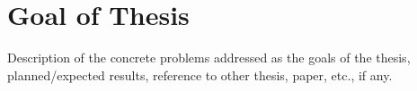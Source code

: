 \section{Goal of Thesis}
\label{sec:goal}

Description of the concrete problems addressed as the goals of the thesis, planned/expected results, reference to other thesis, paper, etc., if any.